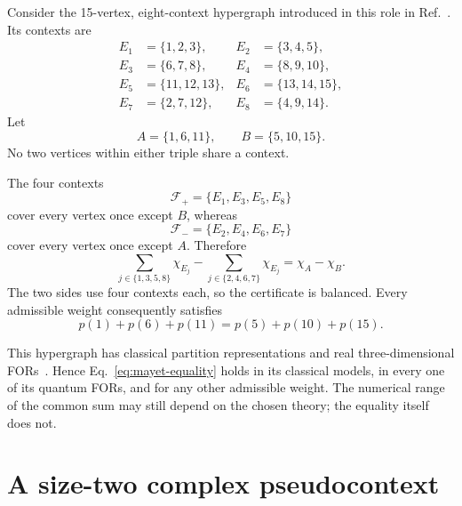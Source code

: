\documentclass[
  twocolumn,
  aps,
  pra,
  floatfix,
  amsmath,amssymb,
  longbibliography
]{revtex4-2}
\theoremstyle{definition}
\theoremstyle{remark}
\begin{document}
Consider the 15-vertex, eight-context hypergraph introduced in this role in
Ref.~\cite{2023-navara-svozil}.  Its contexts are
\begin{align}
 E_1&=\{1,2,3\},& E_2&=\{3,4,5\},\nonumber\\
 E_3&=\{6,7,8\},& E_4&=\{8,9,10\},\nonumber\\
 E_5&=\{11,12,13\},& E_6&=\{13,14,15\},\label{eq:mayet-edges}\\
 E_7&=\{2,7,12\},& E_8&=\{4,9,14\}.\nonumber
\end{align}
Let
\begin{equation}
 A=\{1,6,11\},\qquad B=\{5,10,15\}.
 \label{eq:mayet-targets}
\end{equation}
No two vertices within either triple share a context.

The four contexts
\begin{equation}
 \mathcal F_+=\{E_1,E_3,E_5,E_8\}
 \label{eq:cover-plus}
\end{equation}
cover every vertex once except $B$, whereas
\begin{equation}
 \mathcal F_-=\{E_2,E_4,E_6,E_7\}
 \label{eq:cover-minus}
\end{equation}
cover every vertex once except $A$.  Therefore
\begin{equation}
 \sum_{j\in\{1,3,5,8\}}\chi_{E_j}
 -\sum_{j\in\{2,4,6,7\}}\chi_{E_j}
 =\chi_A-\chi_B.
 \label{eq:mayet-certificate}
\end{equation}
The two sides use four contexts each, so the certificate is balanced.  Every
admissible weight consequently satisfies
\begin{equation}
 p(1)+p(6)+p(11)=p(5)+p(10)+p(15).
 \label{eq:mayet-equality}
\end{equation}

This hypergraph has classical partition representations and real
three-dimensional FORs~\cite{2023-navara-svozil}.  Hence
Eq.~\eqref{eq:mayet-equality} holds in its classical models, in every one of
its quantum FORs, and for any other admissible weight.
The numerical range of the common sum may still depend on the chosen theory;
the equality itself does not.

\section{A size-two complex pseudocontext}
\label{sec:octagon}
\end{document}
